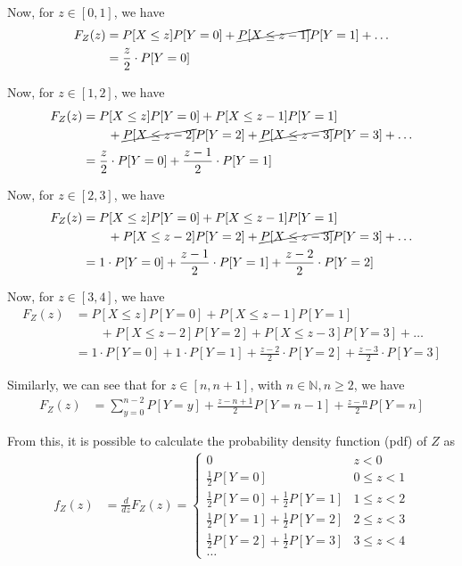 Now, for \( z \in [0, 1] \), we have
\begin{align*}
    F_{Z}(z)
     & =
    P[X \leq z] P[Y = 0]
    +
    \cancel{P[X \leq z-1]} P[Y = 1]
    +
    \ldots
    \\ & =
    \frac{z}{2} \cdot P[Y = 0]
\end{align*}

Now, for \( z \in [1, 2] \), we have
\begin{align*}
    F_{Z}(z)
     & =
    P[X \leq z] P[Y = 0]
    +
    P[X \leq z-1] P[Y = 1]
    \\ & \qquad +
    \cancel{P[X \leq z-2]} P[Y = 2]
    +
    \cancel{P[X \leq z-3]} P[Y = 3]
    +
    \ldots
    \\ & =
    \frac{z}{2} \cdot P[Y = 0]
    +
    \frac{z-1}{2} \cdot P[Y = 1]
\end{align*}

Now, for \( z \in [2, 3] \), we have
\begin{align*}
    F_{Z}(z)
     & =
    P[X \leq z] P[Y = 0]
    +
    P[X \leq z-1] P[Y = 1]
    \\ & \qquad +
    P[X \leq z-2] P[Y = 2]
    +
    \cancel{P[X \leq z-3]} P[Y = 3]
    +
    \ldots
    \\ & =
    1 \cdot P[Y = 0]
    +
    \frac{z-1}{2} \cdot P[Y = 1]
    +
    \frac{z-2}{2} \cdot P[Y = 2]
\end{align*}

Now, for \( z \in [3, 4] \), we have
\begin{align*}
    F_{Z}(z)
     & =
    P[X \leq z] P[Y = 0]
    +
    P[X \leq z-1] P[Y = 1]
    \\ & \qquad +
    P[X \leq z-2] P[Y = 2]
    +
    P[X \leq z-3] P[Y = 3]
    +
    \ldots
    \\ & =
    1 \cdot P[Y = 0]
    +
    1 \cdot P[Y = 1]
    +
    \frac{z-2}{2} \cdot P[Y = 2]
    +
    \frac{z-3}{2} \cdot P[Y = 3]
\end{align*}

Similarly, we can see that for \( z \in [n, n+1] \), with \( n \in \mathbb{N}, n \geq 2 \), we have
\begin{align*}
    F_{Z}(z)
     & =
    \sum_{y=0}^{n-2} P[Y = y]
    +
    \frac{z-n+1}{2} P[Y = n-1]
    +
    \frac{z-n}{2} P[Y = n]
\end{align*}

From this, it is possible to calculate the probability density function (pdf) of \( Z \) as
\begin{align*}
    f_{Z}(z)
     & =
    \frac{d}{dz} F_{Z}(z)
    =
    \begin{cases}
        0                                           & z < 0        \\
        \frac{1}{2} P[Y = 0]                        & 0 \leq z < 1 \\
        \frac{1}{2} P[Y = 0] + \frac{1}{2} P[Y = 1] & 1 \leq z < 2 \\
        \frac{1}{2} P[Y = 1] + \frac{1}{2} P[Y = 2] & 2 \leq z < 3 \\
        \frac{1}{2} P[Y = 2] + \frac{1}{2} P[Y = 3] & 3 \leq z < 4 \\
        \ldots
    \end{cases}
\end{align*}

